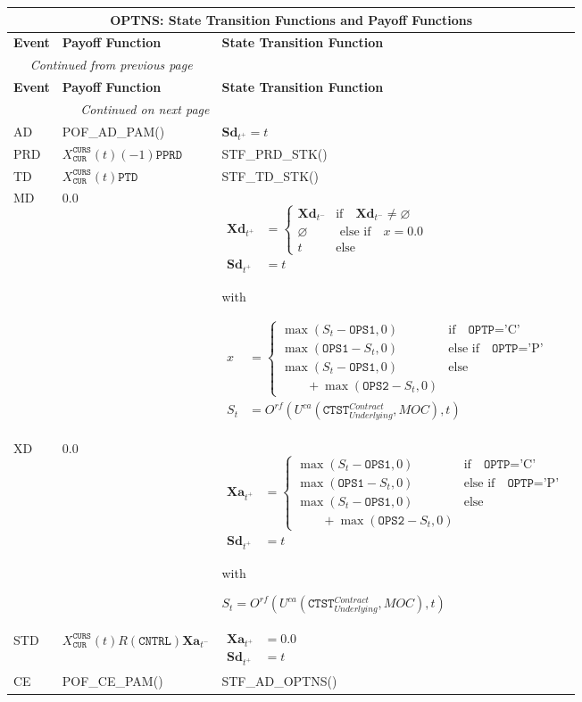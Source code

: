 \documentclass[9pt,oneside]{amsart}
\newenvironment{functions}[1]{
	\hfill %
    	\begin{longtable}{| p{0.05\textwidth} | p{0.42\textwidth} |  p{0.48\textwidth} |}
	\multicolumn{3}{c}{\textbf{#1: State Transition Functions and Payoff Functions}}\\
	\hline
	\textbf{Event} & \textbf{Payoff Function} & \textbf{State Transition Function}\\
	\hline
	\endfirsthead
	\multicolumn{2}{c}{\textit{Continued from previous page}} \\
	\hline
	\textbf{Event} & \textbf{Payoff Function} & \textbf{State Transition Function}\\
	\hline
	\endhead
	\hline \multicolumn{2}{r}{\textit{Continued on next page}} \\
	\endfoot
	\endlastfoot
}{%
	\hline
    	\end{longtable}
}
\newcommand{\svar}[2]{\textbf{#1}_{#2}}
\newcommand{\attr}[1]{\texttt{#1}}
\newcommand{\stf}[2]{STF\_#1\_#2()}
\newcommand{\pof}[2]{POF\_#1\_#2()}
\newcommand{\sgn}{R(\attr{CNTRL})}
\newcommand{\obs}[3]{O^{#1}(#2,#3)}
\newcommand{\cldca}[2]{U^{ca}(#1,#2)}
\newcommand{\undef}{\varnothing}
\begin{document}
\begin{functions}{OPTNS}
	AD & \pof{AD}{PAM} & $\svar{Sd}{t^+} = t$ \\
	\hline
	PRD & $X_{\attr{CUR}}^{\attr{CURS}}(t)(-1)\attr{PPRD}$ & \stf{PRD}{STK} \\
	\hline
	TD & $X_{\attr{CUR}}^{\attr{CURS}}(t)\attr{PTD}$ & \stf{TD}{STK} \\
	\hline
	MD & 0.0 & {$\begin{aligned}
					\svar{Xd}{t^+} &= \begin{cases}
								\svar{Xd}{t^-} & \text{if}\quad \svar{Xd}{t^-} \neq \undef \\
								\undef & \text{ else if}\quad x=0.0 \\
								t & \text{else} \end{cases}  \\
					\svar{Sd}{t^+} &= t \end{aligned}$} \par
			with\par
			{$\begin{aligned}
				x &= \begin{cases}
								\max(S_t-\attr{OPS1},0) & \text{if}\quad \attr{OPTP}=\text{'C'} \\
								\max(\attr{OPS1}-S_t,0) & \text{else if}\quad \attr{OPTP}=\text{'P'} \\
								\max(S_t-\attr{OPS1},0) & \text{else} \\ \qquad + \max(\attr{OPS2}-S_t,0) &  \end{cases} \\
				S_t &= \obs{rf}{\cldca{\attr{CTST}_{Underlying}^{Contract}}{MOC}}{t} \end{aligned}$} \\
	\hline
	XD & 0.0 & {$\begin{aligned}
					\svar{Xa}{t^+} &= \begin{cases}
								\max(S_t-\attr{OPS1},0) & \text{if}\quad \attr{OPTP}=\text{'C'} \\
								\max(\attr{OPS1}-S_t,0) & \text{else if}\quad \attr{OPTP}=\text{'P'} \\
								\max(S_t-\attr{OPS1},0) & \text{else} \\ \qquad + \max(\attr{OPS2}-S_t,0) &  \end{cases} \\
					\svar{Sd}{t^+} &= t \end{aligned}$}\par
with\par
			$S_t=\obs{rf}{\cldca{\attr{CTST}_{Underlying}^{Contract}}{MOC}}{t}$ \\
	\hline
	STD & $X_{\attr{CUR}}^{\attr{CURS}}(t)\sgn\svar{Xa}{t^-}$ & {$\begin{aligned}
					\svar{Xa}{t^+} &= 0.0 \\
					\svar{Sd}{t^+} &= t \end{aligned}$} \\
	\hline
	CE & \pof{CE}{PAM} & \stf{AD}{OPTNS} \\
\end{functions}
\end{document}
